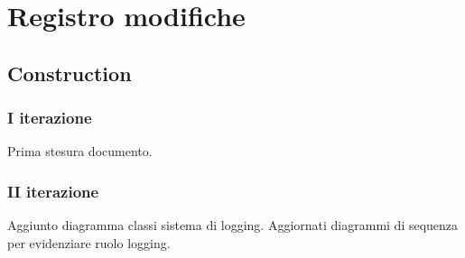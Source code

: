 \documentclass[10pt]{softeng} %
\begin{document}
\startofdocument{}





\clearpage





\section{Registro modifiche}

\subsection{Construction}

\subsubsection{I iterazione}

Prima stesura documento.

\subsubsection{II iterazione}

Aggiunto diagramma classi sistema di logging.
Aggiornati diagrammi di sequenza per evidenziare ruolo logging.


\printcustombib{}

\end{document}
